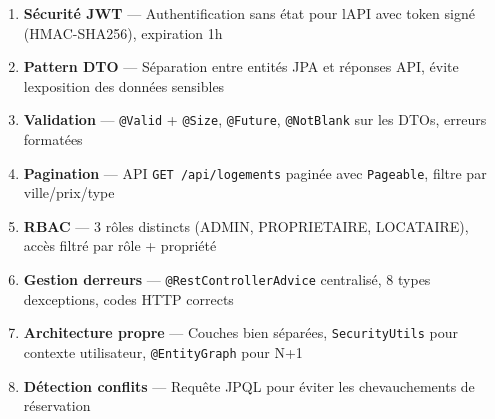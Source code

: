 \documentclass[12pt,a4paper]{article}
\begin{document}
\begin{enumerate}
  \item \textbf{Sécurité JWT} — Authentification sans état pour l\textquotesingle API avec token signé (HMAC-SHA256), expiration 1h
  \item \textbf{Pattern DTO} — Séparation entre entités JPA et réponses API, évite l\textquotesingle exposition des données sensibles
  \item \textbf{Validation} — \texttt{@Valid} + \texttt{@Size}, \texttt{@Future}, \texttt{@NotBlank} sur les DTOs, erreurs formatées
  \item \textbf{Pagination} — API \texttt{GET /api/logements} paginée avec \texttt{Pageable}, filtre par ville/prix/type
  \item \textbf{RBAC} — 3 rôles distincts (ADMIN, PROPRIETAIRE, LOCATAIRE), accès filtré par rôle + propriété
  \item \textbf{Gestion d\textquotesingle erreurs} — \texttt{@RestControllerAdvice} centralisé, 8 types d\textquotesingle exceptions, codes HTTP corrects
  \item \textbf{Architecture propre} — Couches bien séparées, \texttt{SecurityUtils} pour contexte utilisateur, \texttt{@EntityGraph} pour N+1
  \item \textbf{Détection conflits} — Requête JPQL pour éviter les chevauchements de réservation
\end{enumerate}

\begin{center}
\end{center}

\newpage

\end{document}
